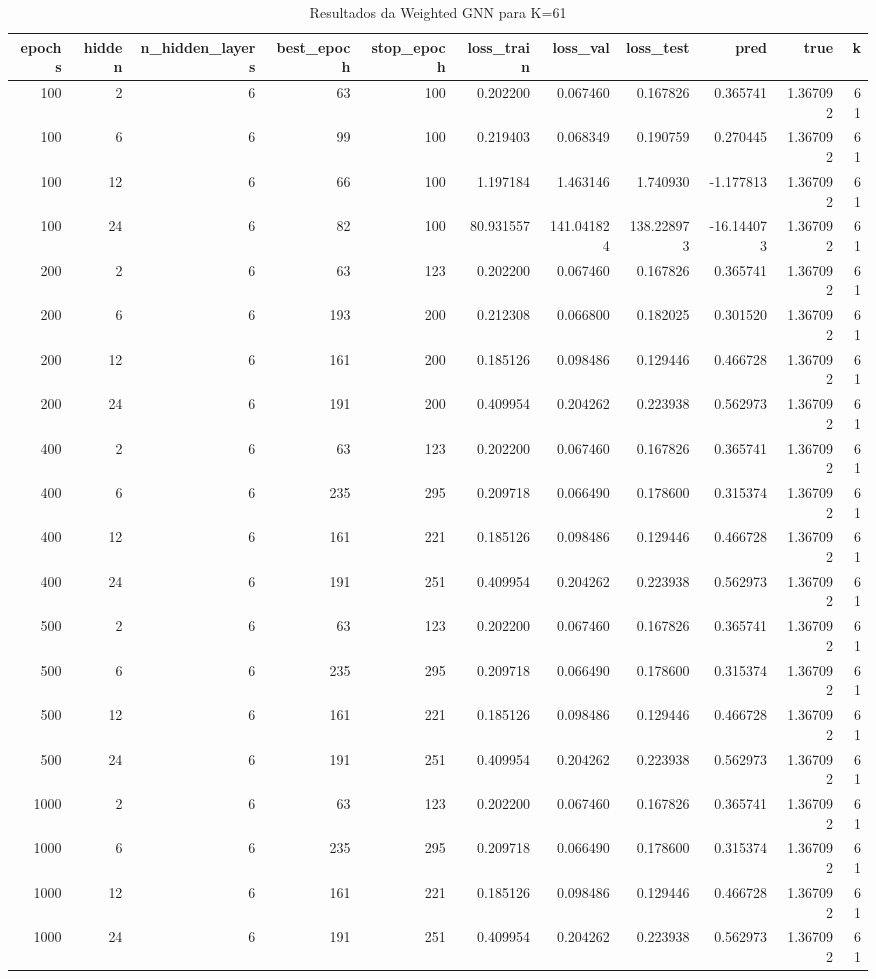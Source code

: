 \begin{table}
\caption{Resultados da Weighted GNN para K=61}
\label{tab:weighted_gnn_results_k61}
\begin{tabular}{rrrrrrrrrrr}
\toprule
epochs & hidden & n\_hidden\_layers & best\_epoch & stop\_epoch & loss\_train & loss\_val & loss\_test & pred & true & k \\
\midrule
100 & 2 & 6 & 63 & 100 & 0.202200 & 0.067460 & 0.167826 & 0.365741 & 1.367092 & 61 \\
100 & 6 & 6 & 99 & 100 & 0.219403 & 0.068349 & 0.190759 & 0.270445 & 1.367092 & 61 \\
100 & 12 & 6 & 66 & 100 & 1.197184 & 1.463146 & 1.740930 & -1.177813 & 1.367092 & 61 \\
100 & 24 & 6 & 82 & 100 & 80.931557 & 141.041824 & 138.228973 & -16.144073 & 1.367092 & 61 \\
200 & 2 & 6 & 63 & 123 & 0.202200 & 0.067460 & 0.167826 & 0.365741 & 1.367092 & 61 \\
200 & 6 & 6 & 193 & 200 & 0.212308 & 0.066800 & 0.182025 & 0.301520 & 1.367092 & 61 \\
200 & 12 & 6 & 161 & 200 & 0.185126 & 0.098486 & 0.129446 & 0.466728 & 1.367092 & 61 \\
200 & 24 & 6 & 191 & 200 & 0.409954 & 0.204262 & 0.223938 & 0.562973 & 1.367092 & 61 \\
400 & 2 & 6 & 63 & 123 & 0.202200 & 0.067460 & 0.167826 & 0.365741 & 1.367092 & 61 \\
400 & 6 & 6 & 235 & 295 & 0.209718 & 0.066490 & 0.178600 & 0.315374 & 1.367092 & 61 \\
400 & 12 & 6 & 161 & 221 & 0.185126 & 0.098486 & 0.129446 & 0.466728 & 1.367092 & 61 \\
400 & 24 & 6 & 191 & 251 & 0.409954 & 0.204262 & 0.223938 & 0.562973 & 1.367092 & 61 \\
500 & 2 & 6 & 63 & 123 & 0.202200 & 0.067460 & 0.167826 & 0.365741 & 1.367092 & 61 \\
500 & 6 & 6 & 235 & 295 & 0.209718 & 0.066490 & 0.178600 & 0.315374 & 1.367092 & 61 \\
500 & 12 & 6 & 161 & 221 & 0.185126 & 0.098486 & 0.129446 & 0.466728 & 1.367092 & 61 \\
500 & 24 & 6 & 191 & 251 & 0.409954 & 0.204262 & 0.223938 & 0.562973 & 1.367092 & 61 \\
1000 & 2 & 6 & 63 & 123 & 0.202200 & 0.067460 & 0.167826 & 0.365741 & 1.367092 & 61 \\
1000 & 6 & 6 & 235 & 295 & 0.209718 & 0.066490 & 0.178600 & 0.315374 & 1.367092 & 61 \\
1000 & 12 & 6 & 161 & 221 & 0.185126 & 0.098486 & 0.129446 & 0.466728 & 1.367092 & 61 \\
1000 & 24 & 6 & 191 & 251 & 0.409954 & 0.204262 & 0.223938 & 0.562973 & 1.367092 & 61 \\
\bottomrule
\end{tabular}
\end{table}
